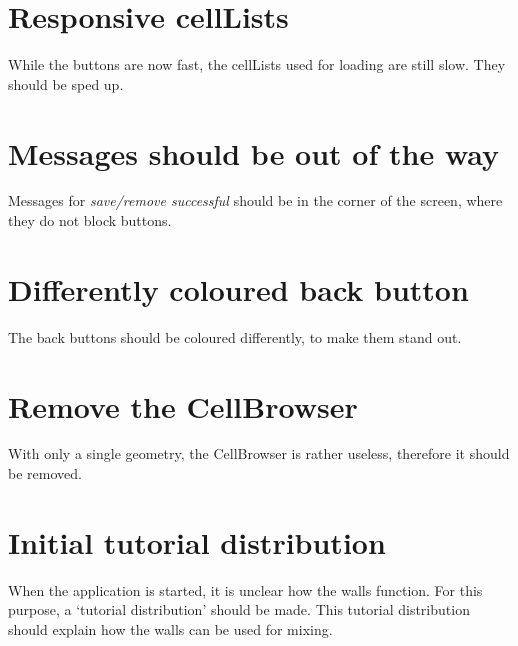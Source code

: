 \section*{Responsive cellLists}
While the buttons are now fast, the cellLists used for loading are still slow. They should be sped up.

\section*{Messages should be out of the way}
Messages for \emph{save/remove successful} should be in the corner of the screen, where they do not block buttons.

\section*{Differently coloured back button}
The back buttons should be coloured differently, to make them stand out.

\section*{Remove the CellBrowser}
With only a single geometry, the CellBrowser is rather useless, therefore it should be removed.

\section*{Initial tutorial distribution}
When the application is started, it is unclear how the walls function. For this purpose, a `tutorial distribution' should be made. This tutorial distribution should explain how the walls can be used for mixing.